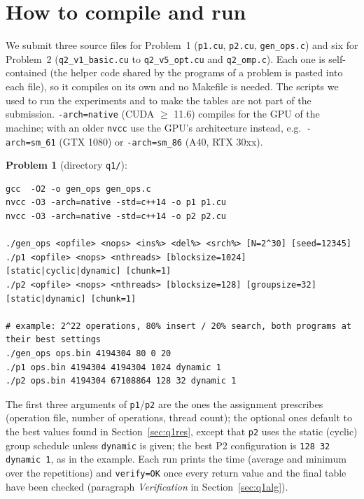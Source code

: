 \documentclass[10pt,a4paper]{article}
\begin{document}
\section{How to compile and run}
We submit three source files for Problem~1 (\texttt{p1.cu}, \texttt{p2.cu},
\texttt{gen\_ops.c}) and six for Problem~2 (\texttt{q2\_v1\_basic.cu} to
\texttt{q2\_v5\_opt.cu} and \texttt{q2\_omp.c}). Each one is self-contained (the helper
code shared by the programs of a problem is pasted into each file), so it compiles on
its own and no Makefile is needed. The scripts we used to run the experiments and to
make the tables are not part of the submission.
\texttt{-arch=native} (CUDA $\ge$ 11.6) compiles for the GPU of the machine; with
an older \texttt{nvcc} use the GPU's architecture instead, e.g.\ \texttt{-arch=sm\_61}
(GTX 1080) or \texttt{-arch=sm\_86} (A40, RTX 30xx).

\textbf{Problem 1} (directory \texttt{q1/}):
{\footnotesize\begin{verbatim}
gcc  -O2 -o gen_ops gen_ops.c
nvcc -O3 -arch=native -std=c++14 -o p1 p1.cu
nvcc -O3 -arch=native -std=c++14 -o p2 p2.cu

./gen_ops <opfile> <nops> <ins%> <del%> <srch%> [N=2^30] [seed=12345]
./p1 <opfile> <nops> <nthreads> [blocksize=1024] [static|cyclic|dynamic] [chunk=1]
./p2 <opfile> <nops> <nthreads> [blocksize=128] [groupsize=32] [static|dynamic] [chunk=1]

# example: 2^22 operations, 80% insert / 20% search, both programs at their best settings
./gen_ops ops.bin 4194304 80 0 20
./p1 ops.bin 4194304 4194304 1024 dynamic 1
./p2 ops.bin 4194304 67108864 128 32 dynamic 1
\end{verbatim}}
The first three arguments of \texttt{p1}/\texttt{p2} are the ones the assignment
prescribes (operation file, number of operations, thread count); the optional ones
default to the best values found in Section~\ref{sec:q1res}, except that \texttt{p2}
uses the static (cyclic) group schedule unless \texttt{dynamic} is given; the best
P2 configuration is \texttt{128 32 dynamic 1}, as in the example. Each run prints the
time (average and minimum over the repetitions) and \texttt{verify=OK} once every
return value and the final table have been checked (paragraph \emph{Verification} in Section~\ref{sec:q1alg}).
\end{document}
